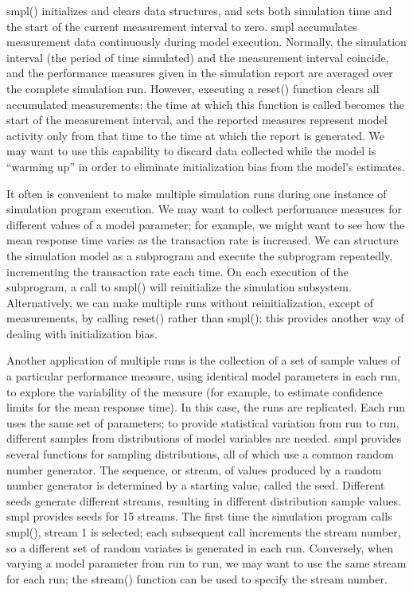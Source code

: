 smpl() initializes and clears data structures, and sets both simulation time
and the start of the current measurement interval to zero. smpl accumulates
measurement data continuously during model execution. Normally, the
simulation interval (the period of time simulated) and the measurement
interval coincide, and the performance measures given in the simulation report
are averaged over the complete simulation run. However, executing a reset()
function clears all accumulated measurements; the time at which this function
is called becomes the start of the measurement interval, and the reported
measures represent model activity only from that time to the time at which the
report is generated. We may want to use this capability to discard data
collected while the model is ``warming up'' in order to eliminate
initialization bias from the model's estimates.

It often is convenient to make multiple simulation runs during one instance of
simulation program execution. We may want to collect performance measures for
different values of a model parameter; for example, we might want to see how
the mean response time varies as the transaction rate is increased. We can
structure the simulation model as a subprogram and execute the subprogram
repeatedly, incrementing the transaction rate each time. On each execution of
the subprogram, a call to smpl() will reinitialize the simulation subsystem.
Alternatively, we can make multiple runs without reinitialization, except of
measurements, by calling reset() rather than smpl(); this provides another way
of dealing with initialization bias.

Another application of multiple runs is the collection of a set of sample
values of a particular performance measure, using identical model parameters
in each run, to explore the variability of the measure (for example, to
estimate confidence limits for the mean response time). In this case, the runs
are replicated. Each run uses the same set of parameters; to provide
statistical variation from run to run, different samples from distributions of
model variables are needed. smpl provides several functions for sampling
distributions, all of which use a common random number generator. The
sequence, or stream, of values produced by a random number generator is
determined by a starting value, called the seed. Different seeds generate
different streams, resulting in different distribution sample values. smpl
provides seeds for 15 streams. The first time the simulation program calls
smpl(), stream 1 is selected; each subsequent call increments the stream
number, so a different set of random variates is generated in each run.
Conversely, when varying a model parameter from run to run, we may want to
use the same stream for each run; the stream() function can be used to specify
the stream number.

